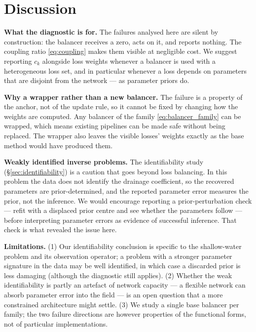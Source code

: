 \documentclass[a4paper,fleqn]{cas-sc}
\begin{document}
\section{Discussion}

\textbf{What the diagnostic is for.} The failures analysed here are silent by
construction: the balancer receives a zero, acts on it, and reports nothing.
The coupling ratio \eqref{eq:coupling} makes them visible at negligible cost.
We suggest reporting $c_k$ alongside loss weights whenever a balancer is used
with a heterogeneous loss set, and in particular whenever a loss depends on
parameters that are disjoint from the network --- as parameter priors do.

\textbf{Why a wrapper rather than a new balancer.} The failure is a property
of the anchor, not of the update rule, so it cannot be fixed by changing how
the weights are computed. Any balancer of the family \eqref{eq:balancer_family}
can be wrapped, which means existing pipelines can be made safe without being
replaced. The wrapper also leaves the visible losses' weights exactly as the
base method would have produced them.

\textbf{Weakly identified inverse problems.} The identifiability study
(\S\ref{sec:identifiability}) is a caution that goes beyond loss balancing. In
this problem the data does not identify the drainage coefficient, so the
recovered parameters are prior-determined, and the reported parameter error
measures the prior, not the inference. We would encourage reporting a
prior-perturbation check --- refit with a displaced prior centre and see
whether the parameters follow --- before interpreting parameter errors as
evidence of successful inference. That check is what revealed the issue here.

\textbf{Limitations.} (1) Our identifiability conclusion is specific to the
shallow-water problem and its observation operator; a problem with a stronger
parameter signature in the data may be well identified, in which case a
discarded prior is less damaging (although the diagnostic still applies). (2)
Whether the weak identifiability is partly an artefact of network capacity ---
a flexible network can absorb parameter error into the field --- is an open
question that a more constrained architecture might settle. (3) We study a
single base balancer per family; the two failure directions are however
properties of the functional forms, not of particular implementations.
\end{document}
